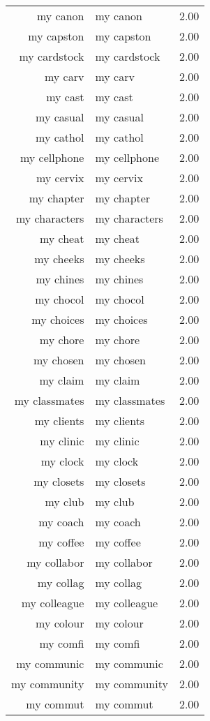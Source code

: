 \begin{table}[ht]
\begin{tabular}{rlr}
  my canon & my canon & 2.00 \\ 
  my capston & my capston & 2.00 \\ 
  my cardstock & my cardstock & 2.00 \\ 
  my carv & my carv & 2.00 \\ 
  my cast & my cast & 2.00 \\ 
  my casual & my casual & 2.00 \\ 
  my cathol & my cathol & 2.00 \\ 
  my cellphone & my cellphone & 2.00 \\ 
  my cervix & my cervix & 2.00 \\ 
  my chapter & my chapter & 2.00 \\ 
  my characters & my characters & 2.00 \\ 
  my cheat & my cheat & 2.00 \\ 
  my cheeks & my cheeks & 2.00 \\ 
  my chines & my chines & 2.00 \\ 
  my chocol & my chocol & 2.00 \\ 
  my choices & my choices & 2.00 \\ 
  my chore & my chore & 2.00 \\ 
  my chosen & my chosen & 2.00 \\ 
  my claim & my claim & 2.00 \\ 
  my classmates & my classmates & 2.00 \\ 
  my clients & my clients & 2.00 \\ 
  my clinic & my clinic & 2.00 \\ 
  my clock & my clock & 2.00 \\ 
  my closets & my closets & 2.00 \\ 
  my club & my club & 2.00 \\ 
  my coach & my coach & 2.00 \\ 
  my coffee & my coffee & 2.00 \\ 
  my collabor & my collabor & 2.00 \\ 
  my collag & my collag & 2.00 \\ 
  my colleague & my colleague & 2.00 \\ 
  my colour & my colour & 2.00 \\ 
  my comfi & my comfi & 2.00 \\ 
  my communic & my communic & 2.00 \\ 
  my community & my community & 2.00 \\ 
  my commut & my commut & 2.00 \\ 

\end{tabular}
\end{table}
